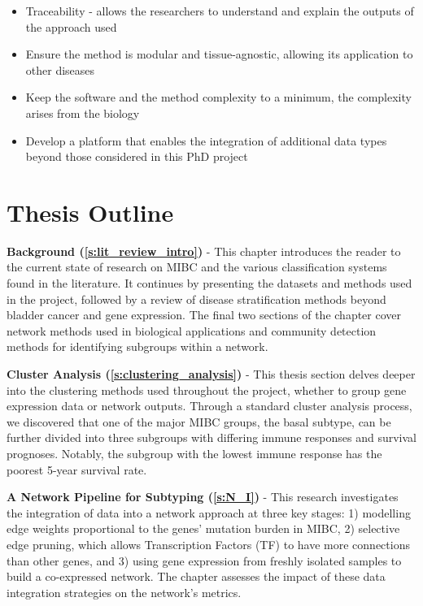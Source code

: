 \begin{itemize}
    \item Traceability - allows the researchers to understand and explain the outputs of the approach used
    \item Ensure the method is modular and tissue-agnostic, allowing its application to other diseases
    \item Keep the software and the method complexity to a minimum, the complexity arises from the biology
    \item Develop a platform that enables the integration of additional data types beyond those considered in this PhD project
\end{itemize}

\section{Thesis Outline}

\textbf{Background (\cref{s:lit_review_intro})} - This chapter introduces the reader to the current state of research on MIBC and the various classification systems found in the literature. It continues by presenting the datasets and methods used in the project, followed by a review of disease stratification methods beyond bladder cancer and gene expression. The final two sections of the chapter cover network methods used in biological applications and community detection methods for identifying subgroups within a network.


\textbf{Cluster Analysis (\cref{s:clustering_analysis})} - This thesis section delves deeper into the clustering methods used throughout the project, whether to group gene expression data or network outputs. Through a standard cluster analysis process, we discovered that one of the major MIBC groups, the basal subtype, can be further divided into three subgroups with differing immune responses and survival prognoses. Notably, the subgroup with the lowest immune response has the poorest 5-year survival rate.

\textbf{A Network Pipeline for Subtyping (\cref{s:N_I})} - This research investigates the integration of data into a network approach at three key stages: 1) modelling edge weights proportional to the genes' mutation burden in MIBC, 2) selective edge pruning, which allows Transcription Factors (TF) to have more connections than other genes, and 3) using gene expression from freshly isolated samples to build a co-expressed network. 
The chapter assesses the impact of these data integration strategies on the network's metrics.


